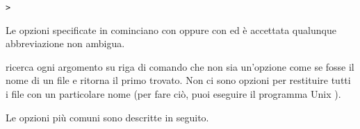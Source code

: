 \documentclass{article}
\begin{document}
\begin{alltt}
> 
%> \Ucom{kpsewhich \var{option}\dots{} \var{filename}\dots{}}
\end{alltt}
Le opzioni specificate in  cominciano con \samp{-} oppure
con \samp{-{}-} ed è accettata qualunque abbreviazione non ambigua.

\KPS{} ricerca ogni argomento su riga di comando che non sia un'opzione
come se fosse il nome di un file e ritorna il primo trovato. Non ci sono
opzioni per restituire tutti i file con un particolare nome (per fare ciò,
puoi eseguire il programma Unix ).

Le opzioni più comuni sono descritte in seguito.
\end{document}
